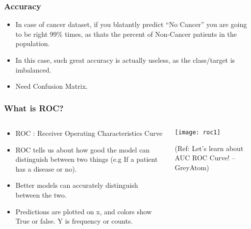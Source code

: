\begin{frame}[fragile]\frametitle{Accuracy}
\begin{itemize}
\item In case of cancer dataset, if you blatantly predict ``No Cancer'' you are going to be right 99\% times, as thats the percent of Non-Cancer patients in the population.
\item In this case, such great accuracy is actually useless, as the class/target is imbalanced. 
\item Need Confusion Matrix.
\end{itemize}

\end{frame}


\begin{frame}[fragile]\frametitle{What is ROC?}

\begin{columns}
\begin{column}[T]{0.5\linewidth}
\begin{itemize}
\item ROC : Receiver Operating Characteristics Curve
\item ROC tells us about how good
the model can distinguish between two things (e.g If a patient has a
disease or no). 
\item Better models can accurately distinguish between the two.
\item Predictions are plotted on x, and colors show True or false. Y is frequency or counts.
\end{itemize}
\end{column}
\begin{column}[T]{0.5\linewidth}

\begin{center}
\texttt{[image: roc1]}
\end{center}

\tiny{(Ref: Let's learn about AUC ROC Curve! – GreyAtom)}
\end{column}

\end{columns}
\end{frame}

